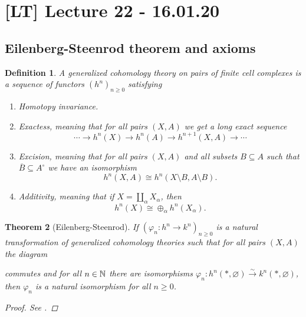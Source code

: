 \documentclass[A4paper, british, reqno]{amsart}
\theoremstyle{darkgreentheorem}
\newtheorem{thm}{Theorem}[section]
\theoremstyle{darkbluedefinition}
\newtheorem{defn}[thm]{Definition}
\theoremstyle{darkredexample}
\theoremstyle{remark}
\newcommand{\1}{\mathbbm{1}}
\newcommand{\op}{\oplus}
\newcommand{\sub}{\subseteq}
\begin{document}
\section{[LT] Lecture 22 - 16.01.20}

\subsection{Eilenberg-Steenrod theorem and axioms}

\begin{defn}
    A \textit{generalized cohomology theory} on pairs of finite cell complexes is a sequence of functors $(h^{n})_{n\geqslant 0}$ satisfying
    \begin{enumerate}[label=(\alph*)]
	\item Homotopy invariance.
	\item Exactess, meaning that for all pairs $(X,A)$ we get a long exact sequence
	    \[ \cdots \to h^{n}(X)\to h^{n}(A)\to h^{n+1}(X,A)\to \cdots \]
	\item Excision, meaning that for all pairs $(X,A)$ and all subsets $B\sub A$ such that $\overline{B}\sub A^{\circ}$ we have an isomorphism
	    \[ h^{n}(X,A)\cong h^{n}(X\setminus B,A\setminus B). \]
	\item Additivity, meaning that if $X=\coprod_{\alpha} X_{\alpha}$, then
	    \[ h^{n}(X)\cong \op_{\alpha}h^{n}(X_{\alpha}). \]
    \end{enumerate}
\end{defn}

\begin{thm}[Eilenberg-Steenrod]
    If $(\varphi_{n}\colon h^{n}\to k^{n})_{n\geqslant 0}$ is a natural transformation of generalized cohomology theories such that for all pairs $(X,A)$ the diagram
    \begin{center}
    \end{center}
    commutes and for all $n\in \mathbb{N}$ there are isomorphisms $\varphi_{n}\colon h^{n}(*,\varnothing)\xrightarrow{\sim} k^{n}(*,\varnothing)$, then $\varphi_{n}$ is a natural isomorphism for all $n\geqslant 0$.
    \begin{proof}
	See \cite[Theorem 3.19]{hat02}.
    \end{proof}
\end{thm}
\end{document}
